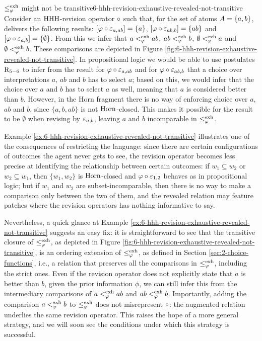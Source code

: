 \begin{xmpl}{$\le^{{\operatorname{exh}}}_{\varphi}$ might not be transitive}{6-hhh-revision-exhaustive-revealed-not-transitive}
	Consider an ${\mathrm{HHH}}$-revision operator $\circ$ such that,
	for the set of atoms $A=\{a,b\}$,
	delivers the following results:
	$[\varphi\circ\varepsilon_{a,ab}]=\{a\}$,
	$[\varphi\circ\varepsilon_{ab,b}]=\{ab\}$
	and
	$[\varphi\circ\varepsilon_{a,b}]=\{\emptyset\}$.
	From this we infer that 
	$a<^{{\operatorname{exh}}}_{\varphi} ab$,
	$ab <^{{\operatorname{exh}}}_{\varphi} b$, 
	$\emptyset <^{{\operatorname{exh}}}_{\varphi} a$
	and 
	$\emptyset <^{{\operatorname{exh}}}_{\varphi} b$.
	These comparisons are depicted in 
	Figure \ref{fig:6-hhh-revision-exhaustive-revealed-not-transitive}.
	In propositional logic we would be able to use 
	postulates $\mathrm{R}_{5-6}$ to infer from
	the result for $\varphi\circ\varepsilon_{a,ab}$ and for
	$\varphi\circ\varepsilon_{ab,b}$
	that a choice over interpretations $a$, $ab$ and $b$
	has to select $a$;
	based on this, we would infer that the choice over $a$ and $b$
	has to select $a$ as well, meaning that $a$ is considered better 
	than $b$.
	However, in the Horn fragment there is no way of 
	enforcing choice over $a$, $ab$ and $b$,
	since $\{a,b,ab\}$ is not $\mathrm{Horn}$-closed.
	This makes it possible for the result to be $\emptyset$
	when revising by $\varepsilon_{a,b}$,
	leaving $a$ and $b$ incomparable in $\le^{{\operatorname{exh}}}_{\varphi}$.
\end{xmpl}

Example \ref{ex:6-hhh-revision-exhaustive-revealed-not-transitive}
illustrates one of the consequences of restricting the
language: since there are certain configurations 
of outcomes the agent never gets to see,
the revision operator
becomes less precise at identifying the relationship 
between certain outcomes:
if $w_1\subseteq w_2$ or $w_2 \subseteq w_1$, 
then $\{w_1,w_2\}$ is $\mathrm{Horn}$-closed and $\varphi\circ\varepsilon_{1,2}$
behaves as in propositional logic;
but if $w_1$ and $w_2$ are subset-incomparable,
then there is no way to make a comparison only between the two of them,
and the revealed relation may feature patches where
the revision operators has nothing informative to say.

Nevertheless, a quick glance at
Example \ref{ex:6-hhh-revision-exhaustive-revealed-not-transitive}
suggests an easy fix:
it is straightforward to see that
the transitive closure of $\le^{{\operatorname{exh}}}_{\varphi}$,
as depicted in Figure \ref{fig:6-hhh-revision-exhaustive-revealed-not-transitive},
is an ordering extension of $\le^{{\operatorname{exh}}}_{\varphi}$, as defined in Section \ref{sec:2-choice-functions},
i.e., a relation that preserves all the comparisons
in $\le^{{\operatorname{exh}}}_{\varphi}$, including the strict ones.
Even if the revision operator does not explicitly state
that $a$ is better than $b$, given the prior information $\phi$,
we can still infer this from the intermediary comparisons 
of $a<^{{\operatorname{exh}}}_{\varphi} ab$ and $ab <^{{\operatorname{exh}}}_{\varphi} b$.
Importantly, adding the comparison $a <^{{\operatorname{exh}}}_{\varphi} b$
to $\le^{{\operatorname{exh}}}_{\varphi}$ does not misrepresent $\circ$: 
the augmented relation underlies the same revision operator.
This raises the hope of a more general strategy,
and we will soon see the conditions under which this strategy is successful.

